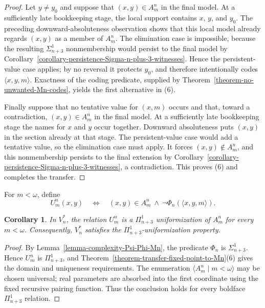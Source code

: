 \documentclass[a4paper,11pt]{article}
\newtheorem{corollary}[theorem]{Corollary}
\begin{document}
\begin{proof}
Let $y\neq y_0$ and suppose that $(x,y)\in A^n_m$ in the final model.  At a
sufficiently late bookkeeping stage, the local support contains $x$, $y$, and
$y_0$.  The preceding downward-absoluteness observation shows that this local
model already regards $(x,y)$ as a member of $A^n_m$.  The elimination case is
impossible, because the resulting $\Sigma^1_{n+3}$ nonmembership would persist
to the final model by
Corollary~\ref{corollary-persistence-Sigma-n-plus-3-witnesses}.  Hence the
persistent-value case applies; by no reversal it protects $y_0$, and therefore
intentionally codes $\langle x,y,m\rangle$.  Exactness of the coding predicate,
supplied by Theorem~\ref{theorem-no-unwanted-Mn-codes}, yields the first
alternative in (6).

Finally suppose that no tentative value for $(x,m)$ occurs and that, toward a
contradiction, $(x,y)\in A^n_m$ in the final model.  At a sufficiently late
bookkeeping stage the names for $x$ and $y$ occur together.  Downward
absoluteness puts $(x,y)$ in the section already at that stage.  The
persistent-value case would add a tentative value, so the elimination case
must apply.  It forces $(x,y)\notin A^n_m$, and this nonmembership persists to
the final extension by
Corollary~\ref{corollary-persistence-Sigma-n-plus-3-witnesses}, a
contradiction.  This proves (6) and completes the transfer.
\end{proof}

For $m<\omega$, define
\[
   U^n_m(x,y)
   \quad\Longleftrightarrow\quad
   (x,y)\in A^n_m
   \ \wedge\
   \neg\Phi_n(\langle x,y,m\rangle).
\]

\begin{corollary}
\label{corollary-Pi-n-plus-3-uniformization-final-model}
In $V_n^\ast$, the relation $U^n_m$ is a
$\Pi^1_{n+3}$ uniformization of $A^n_m$ for every $m<\omega$.
Consequently, $V_n^\ast$ satisfies the
$\Pi^1_{n+3}$-uniformization property.
\end{corollary}

\begin{proof}
By Lemma~\ref{lemma-complexity-Psi-Phi-Mn}, the predicate $\Phi_n$ is
$\Sigma^1_{n+3}$.  Hence $U^n_m$ is $\Pi^1_{n+3}$, and
Theorem~\ref{theorem-transfer-fixed-point-to-Mn}(6) gives the domain and
uniqueness requirements.  The enumeration
$\langle A^n_m\mid m<\omega\rangle$ may be chosen universal; real parameters
are absorbed into the first coordinate using the fixed recursive pairing
function.  Thus the conclusion holds for every boldface
$\Pi^1_{n+3}$ relation.
\end{proof}
\end{document}

